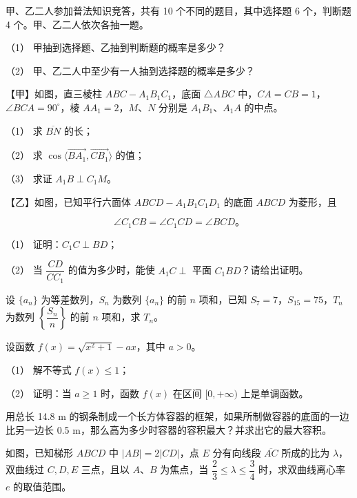\begin{question}
甲、乙二人参加普法知识竞答，共有 10 个不同的题目，其中选择题 6 个，判断题 4 个。甲、乙二人依次各抽一题。

（1） 甲抽到选择题、乙抽到判断题的概率是多少？

（2） 甲、乙二人中至少有一人抽到选择题的概率是多少？

\Needspace{0.4\textheight}
\end{question}
\begin{question}
【甲】如图，直三棱柱 $ABC-A_1B_1C_1$，底面 $\triangle ABC$ 中，$CA=CB=1$，$\angle BCA=90^\circ$，棱 $AA_1=2$，$M$、$N$ 分别是 $A_1B_1$、$A_1A$ 的中点。
\nopagebreak[4]
\begin{center}\end{center}
\nopagebreak[4]
（1） 求 $\overline{BN}$ 的长；

（2） 求 $\cos\langle\overrightarrow{BA_1},\overrightarrow{CB_1}\rangle$ 的值；

（3） 求证 $A_1B\perp C_1M$。

【乙】如图，已知平行六面体 $ABCD-A_1B_1C_1D_1$ 的底面 $ABCD$ 为菱形，且

\nopagebreak[4]
\[
\angle C_1CB=\angle C_1CD=\angle BCD\text{。}
\]
\nopagebreak[4]
\begin{center}\end{center}
\nopagebreak[4]
（1） 证明：$C_1C\perp BD$；

（2） 当 $\dfrac{CD}{CC_1}$ 的值为多少时，能使 $A_1C\perp$ 平面 $C_1BD$？请给出证明。

\end{question}
\begin{question}
设 $\{a_n\}$ 为等差数列，$S_n$ 为数列 $\{a_n\}$ 的前 $n$ 项和，已知 $S_7=7$，$S_{15}=75$，$T_n$ 为数列 $\left\{\dfrac{S_n}{n}\right\}$ 的前 $n$ 项和，求 $T_n$。

\end{question}
\begin{question}
设函数 $f(x)=\sqrt{x^2+1}-ax$，其中 $a>0$。

（1） 解不等式 $f(x)\le1$；

（2） 证明：当 $a\ge1$ 时，函数 $f(x)$ 在区间 $[0,+\infty)$ 上是单调函数。

\end{question}
\begin{question}
用总长 14.8 m 的钢条制成一个长方体容器的框架，如果所制做容器的底面的一边比另一边长 0.5 m，那么高为多少时容器的容积最大？并求出它的最大容积。

\Needspace{0.4\textheight}
\end{question}
\begin{question}
如图，已知梯形 $ABCD$ 中 $|AB|=2|CD|$，点 $E$ 分有向线段 $\overline{AC}$ 所成的比为 $\lambda$，双曲线过 $C,D,E$ 三点，且以 $A\text{、}B$ 为焦点，当 $\dfrac23\le\lambda\le\dfrac34$ 时，求双曲线离心率 $e$ 的取值范围。
\nopagebreak[4]
\begin{center}\end{center}
\nopagebreak[4]

\end{question}